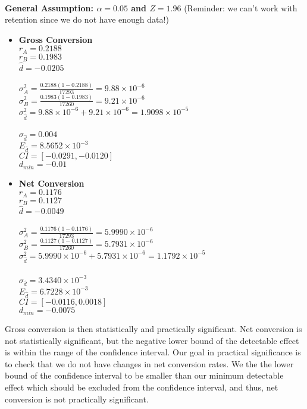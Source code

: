 \documentclass[11pt]{article}
\begin{document}
		~\\
		\textbf{General Assumption: $\alpha=0.05$ and $Z=1.96$}
		(Reminder: we can't work with retention since we do not have enough data!)
		
		\begin{itemize}
			\item \textbf{Gross Conversion} \\
			$r_A = 0.2188$ \\
			$r_B = 0.1983$ \\
			$\hat{d} = -0.0205$ \\
			\\
			$\sigma_{A}^2 = \frac{0.2188(1 - 0.2188)}{17293} = 9.88 \times 10^{-6}$ \\
			$\sigma_{B}^2 = \frac{0.1983(1 - 0.1983)}{17260} = 9.21 \times 10^{-6}$ \\
			$\sigma_{\hat{d}}^2 = 9.88 \times 10^{-6} + 9.21 \times 10^{-6} = 1.9098 \times 10^{-5}$ \\
			\\
			$\sigma_{\hat{d}} = 0.004$ \\
			$E_{\hat{d}} = 8.5652 \times 10^{-3}$ \\
			$CI = [-0.0291, -0.0120]$ \\
			$d_{min} = -0.01$\\
			\item \textbf{Net Conversion} \\
			$r_A = 0.1176$ \\
			$r_B = 0.1127$ \\
			$\hat{d} = -0.0049$ \\
			\\
			$\sigma_{A}^2 = \frac{0.1176(1 - 0.1176)}{17293} = 5.9990 \times 10^{-6}$ \\
			$\sigma_{B}^2 = \frac{0.1127(1 - 0.1127)}{17260} = 5.7931 \times 10^{-6}$ \\
			$\sigma_{\hat{d}}^2 = 5.9990 \times 10^{-6} + 5.7931 \times 10^{-6} = 1.1792 \times 10^{-5}$ \\
			\\
			$\sigma_{\hat{d}} = 3.4340 \times 10^{-3}$ \\
			$E_{\hat{d}} = 6.7228 \times 10^{-3}$ \\
			$CI = [-0.0116, 0.0018]$ \\
			$d_{min} = -0.0075$\\			
		\end{itemize}
		
		Gross conversion is then statistically and practically significant.
		Net conversion is not statistically significant, but the negative lower bound of the detectable effect is within the range of the confidence interval.
		Our goal in practical significance is to check that we do not have changes in net conversion rates.
		We the the lower bound of the confidence interval to be smaller than our minimum detectable effect which should be excluded from the confidence interval, and thus, net conversion is not practically significant.		
\end{document}
